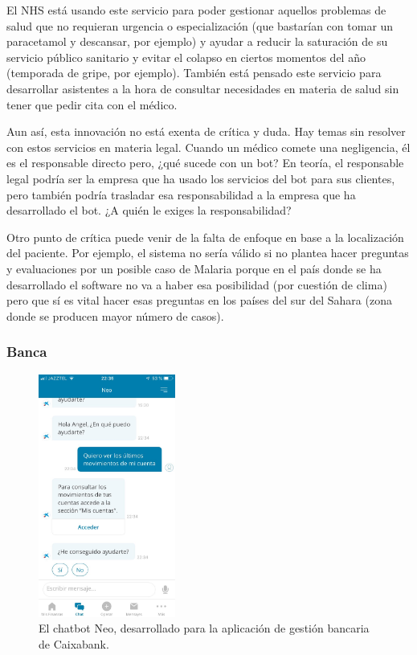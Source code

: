 \documentclass[spanish,12pt, a4paper, twoside]{paper}
\begin{document}
El NHS está usando este servicio para poder gestionar aquellos problemas de salud que no requieran urgencia o especialización (que bastarían con tomar un paracetamol y descansar, por ejemplo) y ayudar a reducir la saturación de su servicio público sanitario y evitar el colapso en ciertos momentos del año (temporada de gripe, por ejemplo).
También está pensado este servicio para desarrollar asistentes a la hora de consultar necesidades en materia de salud sin tener que pedir cita con el médico.
\newline

Aun así, esta innovación no está exenta de crítica y duda. Hay temas sin resolver con estos servicios en materia legal. Cuando un médico comete una negligencia, él es el responsable directo pero, ¿qué sucede con un bot? En teoría, el responsable legal podría ser la empresa que ha usado los servicios del bot para sus clientes, pero también podría trasladar esa responsabilidad a la empresa que ha desarrollado el bot. ¿A quién le exiges la responsabilidad?

Otro punto de crítica puede venir de la falta de enfoque en base a la localización del paciente. Por ejemplo, el sistema no sería válido si no plantea hacer preguntas y evaluaciones por un posible caso de Malaria porque en el país donde se ha desarrollado el software no va a haber esa posibilidad (por cuestión de clima) pero que sí es vital hacer esas preguntas en los países del sur del Sahara (zona donde se producen mayor número de casos).
\newpage

\subsubsection{Banca}

\begin{figure}[h]
\centering
	\includegraphics[width=0.4\textwidth]{recursos/neoCaixabank}
\caption{El chatbot Neo, desarrollado para la aplicación de gestión bancaria de Caixabank.}
\label{fig:Neo, bot de CaixaBank}
\end{figure}
\end{document}
